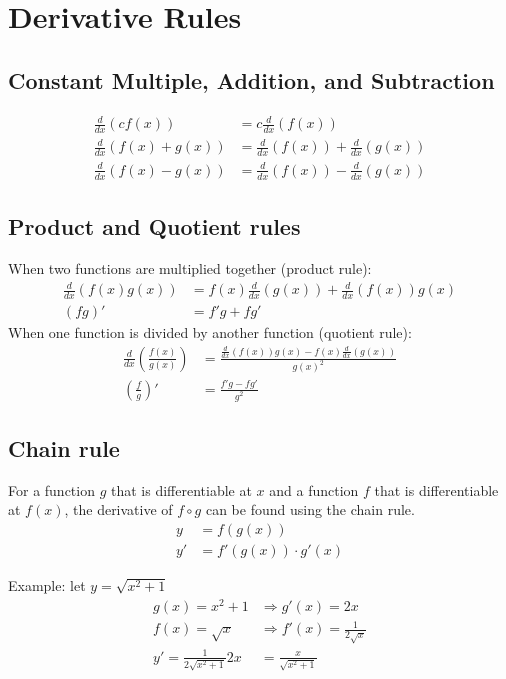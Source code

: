 \documentclass{article}
\theoremstyle{mytheoremstyle}
\theoremstyle{mytheoremstyle}
\theoremstyle{myproblemstyle}
\begin{document}
    \section*{Derivative Rules}
    \subsection*{Constant Multiple, Addition, and Subtraction}
    \begin{align*}
        \frac{d}{dx} (cf(x)) &= c \frac{d}{dx} (f(x)) \\
        \frac{d}{dx} (f(x)+g(x)) &= \frac{d}{dx} (f(x)) + \frac{d}{dx} (g(x)) \\
        \frac{d}{dx} (f(x)-g(x)) &= \frac{d}{dx} (f(x)) - \frac{d}{dx} (g(x))
    \end{align*}

    \subsection*{Product and Quotient rules}
    When two functions are multiplied together (product rule):
    \begin{align*}
        \frac{d}{dx} (f(x)g(x)) &= f(x) \frac{d}{dx} (g(x)) + \frac{d}{dx} (f(x)) g(x) \\
        (fg)' &= f'g + fg'
    \end{align*}
    When one function is divided by another function (quotient rule):
    \begin{align*}
        \frac{d}{dx} (\frac{f(x)}{g(x)}) &= \frac{ \frac{d}{dx} (f(x)) g(x) - f(x) \frac{d}{dx} (g(x))}{g(x)^2} \\
        (\frac{f}{g})' &= \frac{f'g - fg'}{g^2}
    \end{align*}

    \subsection*{Chain rule}
    For a function $g$ that is differentiable at $x$ and a function $f$ that is
    differentiable at $f(x)$, the derivative of $f\circ g$ can be found using
    the chain rule.
    \begin{align*}
        y  &= f(g(x)) \\
        y' &= f'(g(x)) \cdot g'(x)
    \end{align*}

    Example:
    let $y = \sqrt{x^2+1}$
    \begin{align*}
        g(x) = x^2+1 &\Rightarrow g'(x)=2x \\
        f(x) = \sqrt{x} &\Rightarrow f'(x)= \frac{1}{2\sqrt{x}} \\
        y' = \frac{1}{2\sqrt{x^2+1}} 2x &= \frac{x}{\sqrt{x^2+1}}
    \end{align*}
\end{document}
